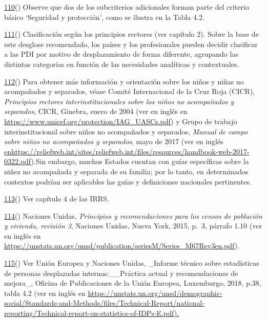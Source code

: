 \documentclass[
]{book}
\begin{document}
\protect\hyperlink{sdfootnote110anc}{110}() Observe que dos de los subcriterios adicionales forman parte del criterio básico `Seguridad y protección', como se ilustra en la Tabla 4.2.

\protect\hyperlink{sdfootnote111anc}{111}() Clasificación según los principios rectores (ver capítulo 2). Sobre la base de este desglose recomendado, los países y los profesionales pueden decidir clasificar a las PDI por motivo de desplazamiento de forma diferente, agrupando las distintas categorías en función de las necesidades analíticas y contextuales.

\protect\hyperlink{sdfootnote112anc}{112}() Para obtener más información y orientación sobre los niños y niñas no acompañados y separados, véase Comité Internacional de la Cruz Roja (CICR), \emph{Principios rectores interinstitucionales sobre los niños no acompañados y separados}, CICR, Ginebra, enero de 2004 (ver en inglés en \url{https://www.unicef.org/protection/IAG_UASCs.pdf}) y Grupo de trabajo interinstitucional sobre niños no acompañados y separados, \emph{Manual de campo sobre niños no acompañados y separados}, mayo de 2017 (ver en inglés \href{https://reliefweb.int/sites/reliefweb.int/files/resources/handbook-web-2017-0322.pdf}{enhttps://reliefweb.int/sites/reliefweb.int/files/resources/handbook-web-2017-0322.pdf}).Sin embargo, muchos Estados cuentan con guías específicas sobre la niñez no acompañada y separada de su familia; por lo tanto, en determinados contextos podrían ser aplicables las guías y definiciones nacionales pertinentes.

\protect\hyperlink{sdfootnote113anc}{113}() Ver capítulo 4 de las IRRS.

\protect\hyperlink{sdfootnote114anc}{114}() Naciones Unidas, \emph{Principios y recomendaciones para los censos de población y vivienda, revisión 3}, Naciones Unidas, Nueva York, 2015, p.~3, párrafo 1.10 (ver en inglés en \url{https://unstats.un.org/unsd/publication/seriesM/Series_M67Rev3en.pdf}).

\protect\hyperlink{sdfootnote115anc}{115}() Ver Unión Europea y Naciones Unidas, \_Informe técnico sobre estadísticas de personas desplazadas internas:\_\_Práctica actual y recomendaciones de mejora\_, Oficina de Publicaciones de la Unión Europea, Luxemburgo, 2018, p.38, tabla 4.2 (ver en inglés en \href{https://unstats.un.org/unsd/demographic-social/Standards-and-Methods/files/Technical-Report/national-reporting/Technical-report-on-statistics-of-IDPs-E.pdf}{https://unstats.un.org/unsd/demographic-social/Standards-and-Methods/files/Technical-Report/national-reporting/Technical-report-on-statistics-of-IDPs-E.pdf).}
\end{document}
